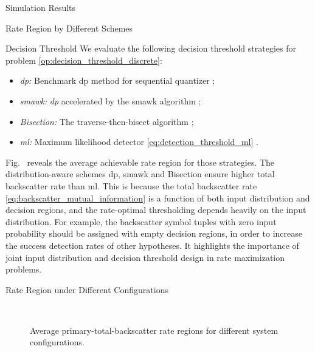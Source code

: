 \begin{section}{Simulation Results}
\begin{subsection}{Rate Region by Different Schemes}
		\begin{subsubsection}{Decision Threshold}
			We evaluate the following decision threshold strategies for problem \eqref{op:decision_threshold_discrete}:
			\begin{itemize}
				\item \emph{\gls{dp}:} Benchmark \gls{dp} method for sequential quantizer \cite{He2021};
				\item \emph{\gls{smawk}:} \emph{\gls{dp}} accelerated by the \gls{smawk} algorithm \cite{He2021};
				\item \emph{Bisection:} The traverse-then-bisect algorithm \cite{Nguyen2020a};
				\item \emph{\gls{ml}:} Maximum likelihood detector \eqref{eq:detection_threshold_ml} \cite{Qian2019}.
			\end{itemize}

			Fig.~ reveals the average achievable rate region for those strategies.
			The distribution-aware schemes \gls{dp}, \gls{smawk} and Bisection ensure higher total backscatter rate than \gls{ml}.
			This is because the total backscatter rate \eqref{eq:backscatter_mutual_information} is a function of both input distribution and decision regions, and the rate-optimal thresholding depends heavily on the input distribution.
			For example, the backscatter symbol tuples with zero input probability should be assigned with empty decision regions, in order to increase the success detection rates of other hypotheses.
			It highlights the importance of joint input distribution and decision threshold design in rate maximization problems.
		\end{subsubsection}

	\end{subsection}


	\begin{subsection}{Rate Region under Different Configurations}
		\begin{figure}[H]
			\centering
			\\
			\caption{
				Average primary-total-backscatter rate regions for different system configurations.
			}
			\label{fg:region_config_1}
		\end{figure}


\end{subsection}
\end{section}
